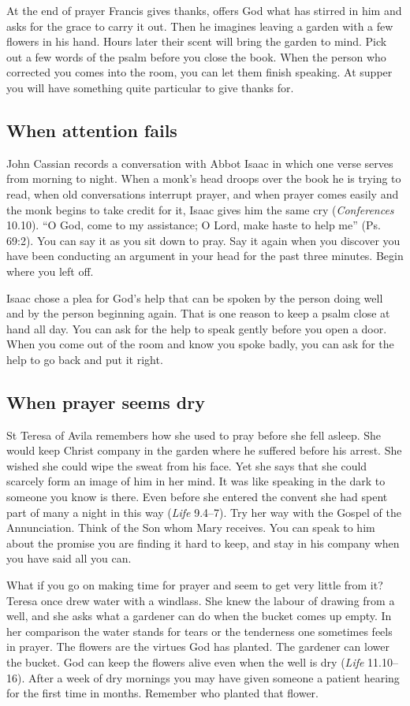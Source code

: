 At the end of prayer Francis gives thanks, offers God what has stirred
in him and asks for the grace to carry it out. Then he imagines leaving
a garden with a few flowers in his hand. Hours later their scent will
bring the garden to mind. Pick out a few words of the psalm before you
close the book. When the person who corrected you comes into the room,
you can let them finish speaking. At supper you will have something
quite particular to give thanks for.

\subsection{When attention fails}

John Cassian records a conversation with Abbot Isaac in which one verse
serves from morning to night. When a monk's head droops over the book he
is trying to read, when old conversations interrupt prayer, and when
prayer comes easily and the monk begins to take credit for it, Isaac gives
him the same cry (\textit{Conferences} 10.10). “O God, come to my assistance;
O Lord, make haste to help me” (Ps. 69:2). You can say it as you sit down
to pray. Say it again when you discover you have been conducting an argument
in your head for the past three minutes. Begin where you left off.

Isaac chose a plea for God's help that can be spoken by the person
doing well and by the person beginning again. That is one reason to keep
a psalm close at hand all day. You can ask for the help to speak gently
before you open a door. When you come out of the room and know you spoke
badly, you can ask for the help to go back and put it right.

\subsection{When prayer seems dry}

St Teresa of Avila remembers how she used to pray before she fell
asleep. She would keep Christ company in the garden where he suffered
before his arrest. She wished she could wipe the sweat from his face.
Yet she says that she could scarcely form an image of him in her mind.
It was like speaking in the dark to someone you know is there. Even
before she entered the convent she had spent part of many a night in
this way (\emph{Life} 9.4--7). Try her way with the Gospel of the
Annunciation. Think of the Son whom Mary receives. You can speak to him
about the promise you are finding it hard to keep, and stay in his
company when you have said all you can.

What if you go on making time for prayer and seem to get very little
from it? Teresa once drew water with a windlass. She knew the labour
of drawing from a well, and she asks what a gardener can do when the
bucket comes up empty. In her comparison the water stands for tears or
the tenderness one sometimes feels in prayer. The flowers are the virtues
God has planted. The gardener can lower the bucket. God can keep the
flowers alive even when the well is dry (\emph{Life} 11.10--16).
After a week of dry mornings you may have given someone a patient
hearing for the first time in months. Remember who planted that flower.
